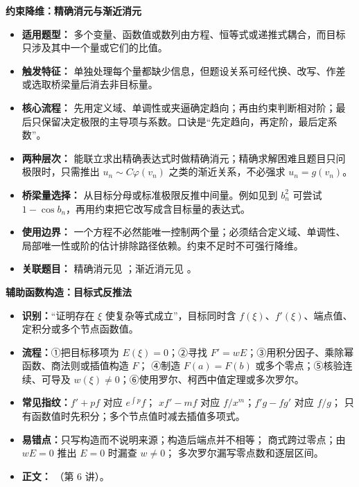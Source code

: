 \begin{knowledgeBox}
\textbf{约束降维：精确消元与渐近消元}

\begin{itemize}
  \item \textbf{适用题型：} 多个变量、函数值或数列由方程、恒等式或递推式耦合，而目标只涉及其中一个量或它们的比值。
  \item \textbf{触发特征：} 单独处理每个量都缺少信息，但题设关系可经代换、改写、作差或选取桥梁量后消去非目标量。
  \item \textbf{核心流程：} 先用定义域、单调性或夹逼确定趋向；再由约束判断相对阶；最后只保留决定极限的主导项与系数。口诀是“先定趋向，再定阶，最后定系数”。
  \item \textbf{两种层次：} 能联立求出精确表达式时做精确消元；精确求解困难且题目只问极限时，只需推出 \(u_n\sim C\varphi(v_n)\) 之类的渐近关系，不必强求 \(u_n=g(v_n)\)。
  \item \textbf{桥梁量选择：} 从目标分母或标准极限反推中间量。例如见到 \(b_n^2\) 可尝试 \(1-\cos b_n\)，再用约束把它改写成含目标量的表达式。
  \item \textbf{使用边界：} 一个方程不必然能唯一控制两个量；必须结合定义域、单调性、局部唯一性或阶的估计排除路径依赖。约束不足时不可强行降维。
  \item \textbf{关联题目：} 精确消元见 ；渐近消元见 。
\end{itemize}
\end{knowledgeBox}

\begin{knowledgeBox}
\textbf{辅助函数构造：目标式反推法}

\begin{itemize}
  \item \textbf{识别：}“证明存在 \(\xi\) 使复杂等式成立”，目标同时含
  \(f(\xi)\)、\(f'(\xi)\)、端点值、定积分或多个节点函数值。
  \item \textbf{流程：}①把目标移项为 \(E(\xi)=0\)；②寻找
  \(F'=wE\)；③用积分因子、乘除幂函数、商法则或插值构造 \(F\)；
  ④制造 \(F(a)=F(b)\) 或多个零点；⑤核验连续、可导及
  \(w(\xi)\ne0\)；⑥使用罗尔、柯西中值定理或多次罗尔。
  \item \textbf{常见指纹：}\(f'+pf\) 对应 \(e^{\int p}f\)；
  \(xf'-mf\) 对应 \(f/x^m\)；\(f'g-fg'\) 对应 \(f/g\)；
  只有函数值时先积分；多个节点值时减去插值多项式。
  \item \textbf{易错点：}只写构造而不说明来源；构造后端点并不相等；
  商式跨过零点；由 \(wE=0\) 推出 \(E=0\) 时漏查 \(w\ne0\)；
  多次罗尔漏写零点数和逐层区间。
  \item \textbf{正文：}
  （第 6 讲）。
\end{itemize}
\end{knowledgeBox}

